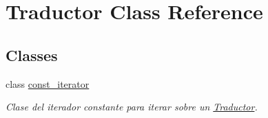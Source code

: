 \hypertarget{class_traductor}{}\section{Traductor Class Reference}
\label{class_traductor}
\subsection*{Classes}
\begin{DoxyCompactItemize}
\item 
class \hyperlink{class_traductor_1_1const__iterator}{const\+\_\+iterator}
\begin{DoxyCompactList}\small\item\em Clase del iterador constante para iterar sobre un \hyperlink{class_traductor}{Traductor}. \end{DoxyCompactList}\end{DoxyCompactItemize}
